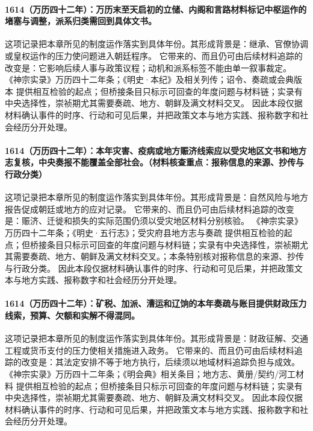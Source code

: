 \paragraph{1614（万历四十二年）：万历末至天启初的立储、内阁和言路材料标记中枢运作的堵塞与调整，派系归类需回到具体文书。} 这项记录把本章所见的制度运作落实到具体年份。其形成背景是：继承、官僚协调或皇权运作的压力使问题进入朝廷程序。 它带来的、而且仍可由后续材料追踪的改变是：它影响后续人事与政策议程；动机和派系标签不能由单一叙事裁定。 《神宗实录》万历四十二年条；《明史·本纪》及相关列传；诏令、奏疏或会典版本 提供相互检验的起点；但桥接条目只标示可回查的年度问题与材料链；实录有中央选择性，崇祯期尤其需要奏疏、地方、朝鲜及满文材料交叉。 因此本段仅据材料确认事件的时序、行动和可见后果，并把政策文本与地方实践、报称数字和社会经历分开处理。

\paragraph{1614（万历四十二年）：本年灾害、疫病或地方赈济线索应以受灾地区文书和地方志复核，中央奏报不能覆盖全部社会。（材料核查重点：报称信息的来源、抄传与行政分类）} 这项记录把本章所见的制度运作落实到具体年份。其形成背景是：自然风险与地方报告促成朝廷或地方的应对记录。 它带来的、而且仍可由后续材料追踪的改变是：赈济、迁徙和损失的实际范围仍须以受灾地区材料分别核验。 《神宗实录》万历四十二年条；《明史·五行志》；受灾府县地方志与奏疏 提供相互检验的起点；但桥接条目只标示可回查的年度问题与材料链；实录有中央选择性，崇祯期尤其需要奏疏、地方、朝鲜及满文材料交叉。；本条特别核对报称信息的来源、抄传与行政分类。 因此本段仅据材料确认事件的时序、行动和可见后果，并把政策文本与地方实践、报称数字和社会经历分开处理。

\paragraph{1614（万历四十二年）：矿税、加派、漕运和辽饷的本年奏疏与账目提供财政压力线索，预算、欠额和实解不得混同。} 这项记录把本章所见的制度运作落实到具体年份。其形成背景是：财政征解、交通工程或货币支付的压力使相关措施进入政务。 它带来的、而且仍可由后续材料追踪的改变是：其法定安排不等于地方执行，后续须以地域材料追踪负担与成效。 《神宗实录》万历四十二年条；《明会典》相关条目；地方志、黄册/契约/河工材料 提供相互检验的起点；但桥接条目只标示可回查的年度问题与材料链；实录有中央选择性，崇祯期尤其需要奏疏、地方、朝鲜及满文材料交叉。 因此本段仅据材料确认事件的时序、行动和可见后果，并把政策文本与地方实践、报称数字和社会经历分开处理。

